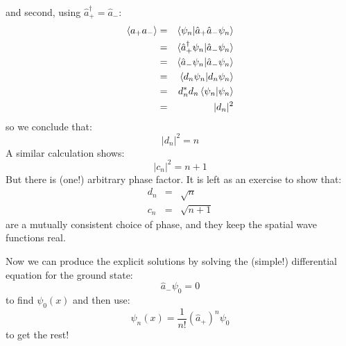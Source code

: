 \documentclass[12pt]{book}
\begin{document}
and second, using $\hat{a}_+^\dagger = \hat{a}_-$:
\begin{eqnarray*}
\braket{a_+a_-} &=& \braket{\psi_n | \hat{a}_+ \hat{a}_- \psi_n}\\
 &=& \braket{\hat{a}_+^\dagger \psi_n | \hat{a}_- \psi_n}\\
 &=& \braket{\hat{a}_- \psi_n | \hat{a}_- \psi_n}\\
 &=& \braket{d_n \psi_n | d_n \psi_n}\\
 &=& d_n^* d_n \braket{\psi_n | \psi_n}\\
 &=& |d_n|^2\\ 
\end{eqnarray*}
so we conclude that:
$$|d_n|^2 = n$$
A similar calculation shows:
$$|c_n|^2 = n+1$$
But there is (one!) arbitrary phase factor.  It is left as an exercise to show that:
\begin{eqnarray*}
d_n &=& \sqrt{n}\\
c_n &=& \sqrt{n+1} 
\end{eqnarray*}
are a mutually consistent choice of phase, and they keep the spatial wave functions real.

Now we can produce the explicit solutions by solving the (simple!) differential equation for the ground state:
$$\hat{a}_- \psi_0 = 0$$
to find $\psi_0(x)$ and then use:
$$\psi_n(x) = \frac{1}{n!}(\hat{a}_+)^n \psi_0$$
to get the rest!
\end{document}
